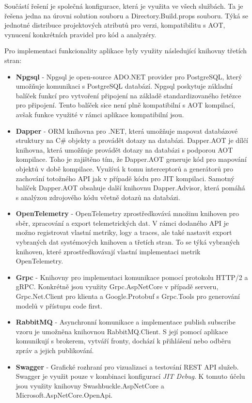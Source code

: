 Součástí řešení je společná konfigurace, která je využita ve všech službách. Ta je řešena jedna na úrovni solution souboru a Directory.Build.props souboru. Týká se jednotné distribuce projektových atributů pro verzi, kompatibilitu s AOT, vynucení konkrétních pravidel pro kód a analyzéry.


Pro implementaci funkcionality aplikace byly využity následující knihovny třetích stran:

\begin{itemize}
  \item \textbf{Npgsql} - Npgsql je open-source ADO.NET provider pro PostgreSQL, který umožňuje komunikaci s PostgreSQL databází. Npgsql poskytuje základní balíček funkcí pro vytvoření připojení na základě standardizovaného řetězce pro připojení. Tento balíček sice není plně kompatibilní s AOT kompilací, avšak funkce využité v rámci aplikace kompatibilní jsou.
  \item \textbf{Dapper} - ORM knihovna pro .NET, která umožňuje mapovat databázové struktury na C\# objekty a provádět dotazy na databázi. Dapper.AOT je dílčí knihovna, která umožňuje provádět dotazy na databázi s podporou AOT kompilace. Toho je zajištěno tím, že Dapper.AOT generuje kód pro mapování objektů v době kompilace. Využívá k tomu interceptorů a generátorů pro zachování totožného API jak v případě kódu pro JIT kompilaci. Samotný balíček Dapper.AOT obsahuje další knihovnu Dapper.Advisor, která pomáhá s analýzou zdrojového kódu včetně dotazů na databázi.
  \item \textbf{OpenTelemetry} - OpenTelemetry zprostředkovává množinu knihoven pro sběr, zpracování a export telemetrických dat. V rámci dodaného API je možno registrovat vlastní metriky, logy a traces, ale také nastavit export vybraných dat systémových knihoven a třetích stran. To se týká vybraných knihoven, které zprostředkovávají vlastní implementaci metrik OpenTelemetry.
  \item \textbf{Grpc} - Knihovny pro implementaci komunikace pomocí protokolu HTTP/2 a gRPC. Konkrétně jsou využity Grpc.AspNetCore v případě serveru, Grpc.Net.Client pro klienta a Google.Protobuf s Grpc.Tools pro generování modelů v přístupu code first.
  \item \textbf{RabbitMQ} - Asynchronní komunikace a implementace publish subscribe vzoru je umožněna knihovnou RabbitMQ.Client. S její pomocí aplikace komunikují s brokerem, vytváří fronty, dochází k přihlášení nebo odběru zpráv a jejich publikování.
  \item \textbf{Swagger} - Grafické rozhraní pro vizualizaci a testování REST API služeb. Swagger je využit pouze v kombinaci konfigurací \emph{JIT Debug}. K tomuto účelu jsou využity knihovny Swashbuckle.AspNetCore a Microsoft.AspNetCore.OpenApi.
\end{itemize}

